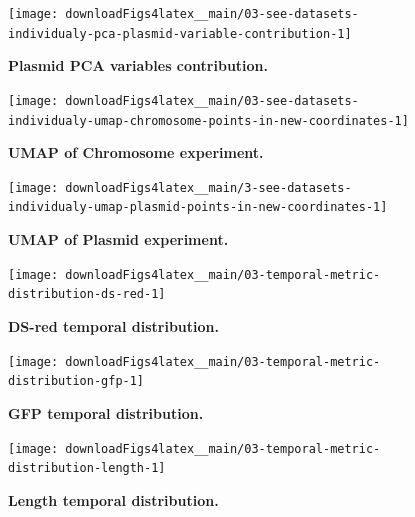 \documentclass[a4paper, nobind]{templates/ociamthesis}
\begin{document}
\begin{figure}[H]
\texttt{[image: downloadFigs4latex\_\_main/03-see-datasets-individualy-pca-plasmid-variable-contribution-1]} \caption[Plasmid PCA variables contribution.]{\textbf{Plasmid PCA variables contribution.}}\label{fig:03-see-datasets-individualy-pca-plasmid-variable-contribution-1}
\end{figure}





\begin{figure}[H]
\texttt{[image: downloadFigs4latex\_\_main/03-see-datasets-individualy-umap-chromosome-points-in-new-coordinates-1]} \caption[UMAP of Chromosome experiment.]{\textbf{UMAP of Chromosome experiment.}}\label{fig:03-see-datasets-individualy-umap-chromosome-points-in-new-coordinates-1}
\end{figure}





\begin{figure}[H]
\texttt{[image: downloadFigs4latex\_\_main/3-see-datasets-individualy-umap-plasmid-points-in-new-coordinates-1]} \caption[UMAP of Plasmid experiment.]{\textbf{UMAP of Plasmid experiment.}}\label{fig:3-see-datasets-individualy-umap-plasmid-points-in-new-coordinates-1}
\end{figure}





\begin{figure}[H]
\texttt{[image: downloadFigs4latex\_\_main/03-temporal-metric-distribution-ds-red-1]} \caption[DS-red temporal distribution.]{\textbf{DS-red temporal distribution.}}\label{fig:03-temporal-metric-distribution-ds-red-1}
\end{figure}





\begin{figure}[H]
\texttt{[image: downloadFigs4latex\_\_main/03-temporal-metric-distribution-gfp-1]} \caption[GFP temporal distribution.]{\textbf{GFP temporal distribution.}}\label{fig:03-temporal-metric-distribution-gfp-1}
\end{figure}





\begin{figure}[H]
\texttt{[image: downloadFigs4latex\_\_main/03-temporal-metric-distribution-length-1]} \caption[Length temporal distribution.]{\textbf{Length temporal distribution.}}\label{fig:03-temporal-metric-distribution-length-1}
\end{figure}
\end{document}
